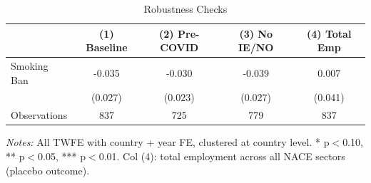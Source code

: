 \begin{table}[H]
\centering
\caption{Robustness Checks}
\label{tab:robust}
\small
\begin{threeparttable}
\begin{tabular}{lcccc}
\toprule
& (1) Baseline & (2) Pre-COVID & (3) No IE/NO & (4) Total Emp \\
\midrule
Smoking Ban & -0.035 & -0.030 & -0.039 & 0.007 \\
& (0.027) & (0.023) & (0.027) & (0.041) \\
\midrule
Observations & 837 & 725 & 779 & 837 \\
\bottomrule
\end{tabular}
\begin{tablenotes}[flushleft]
\footnotesize
\item \textit{Notes:} All TWFE with country + year FE, clustered at country level. * p$<$0.10, ** p$<$0.05, *** p$<$0.01. Col (4): total employment across all NACE sectors (placebo outcome).
\end{tablenotes}
\end{threeparttable}
\end{table}
